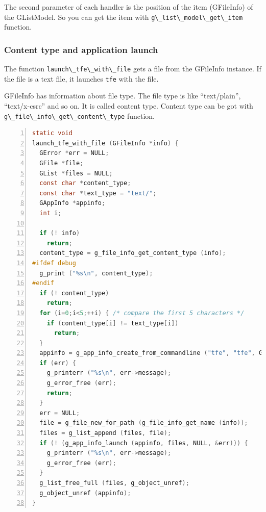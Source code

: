 The second parameter of each handler is the position of the item
(GFileInfo) of the GListModel. So you can get the item with
\passthrough{\lstinline!g\_list\_model\_get\_item!} function.

\subsubsection{Content type and application
launch}\label{content-type-and-application-launch}

The function \passthrough{\lstinline!launch\_tfe\_with\_file!} gets a
file from the GFileInfo instance. If the file is a text file, it
launches \passthrough{\lstinline!tfe!} with the file.

GFileInfo has information about file type. The file type is like
``text/plain'', ``text/x-csrc'' and so on. It is called content type.
Content type can be got with
\passthrough{\lstinline!g\_file\_info\_get\_content\_type!} function.

\begin{lstlisting}[language=C, numbers=left]
static void
launch_tfe_with_file (GFileInfo *info) {
  GError *err = NULL;
  GFile *file;
  GList *files = NULL;
  const char *content_type;
  const char *text_type = "text/";
  GAppInfo *appinfo;
  int i;

  if (! info)
    return;
  content_type = g_file_info_get_content_type (info);
#ifdef debug
  g_print ("%s\n", content_type);
#endif
  if (! content_type)
    return;
  for (i=0;i<5;++i) { /* compare the first 5 characters */
    if (content_type[i] != text_type[i])
      return;
  }
  appinfo = g_app_info_create_from_commandline ("tfe", "tfe", G_APP_INFO_CREATE_NONE, &err);
  if (err) {
    g_printerr ("%s\n", err->message);
    g_error_free (err);
    return;
  }
  err = NULL;
  file = g_file_new_for_path (g_file_info_get_name (info));
  files = g_list_append (files, file);
  if (! (g_app_info_launch (appinfo, files, NULL, &err))) {
    g_printerr ("%s\n", err->message);
    g_error_free (err);
  }
  g_list_free_full (files, g_object_unref);
  g_object_unref (appinfo);
}
\end{lstlisting}

